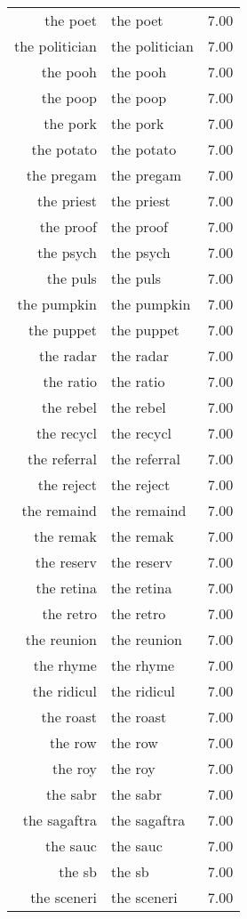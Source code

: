 \begin{table}[ht]
\begin{tabular}{rlr}
  the poet & the poet & 7.00 \\ 
  the politician & the politician & 7.00 \\ 
  the pooh & the pooh & 7.00 \\ 
  the poop & the poop & 7.00 \\ 
  the pork & the pork & 7.00 \\ 
  the potato & the potato & 7.00 \\ 
  the pregam & the pregam & 7.00 \\ 
  the priest & the priest & 7.00 \\ 
  the proof & the proof & 7.00 \\ 
  the psych & the psych & 7.00 \\ 
  the puls & the puls & 7.00 \\ 
  the pumpkin & the pumpkin & 7.00 \\ 
  the puppet & the puppet & 7.00 \\ 
  the radar & the radar & 7.00 \\ 
  the ratio & the ratio & 7.00 \\ 
  the rebel & the rebel & 7.00 \\ 
  the recycl & the recycl & 7.00 \\ 
  the referral & the referral & 7.00 \\ 
  the reject & the reject & 7.00 \\ 
  the remaind & the remaind & 7.00 \\ 
  the remak & the remak & 7.00 \\ 
  the reserv & the reserv & 7.00 \\ 
  the retina & the retina & 7.00 \\ 
  the retro & the retro & 7.00 \\ 
  the reunion & the reunion & 7.00 \\ 
  the rhyme & the rhyme & 7.00 \\ 
  the ridicul & the ridicul & 7.00 \\ 
  the roast & the roast & 7.00 \\ 
  the row & the row & 7.00 \\ 
  the roy & the roy & 7.00 \\ 
  the sabr & the sabr & 7.00 \\ 
  the sagaftra & the sagaftra & 7.00 \\ 
  the sauc & the sauc & 7.00 \\ 
  the sb & the sb & 7.00 \\ 
  the sceneri & the sceneri & 7.00 \\ 

\end{tabular}
\end{table}
